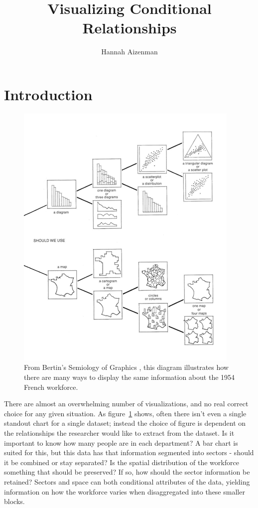 \documentclass[letterpaper,onecolumn,titlepage]{Ythesis}
\title{Visualizing Conditional Relationships}
\author{Hannah Aizenman}
\begin{document}
\makefrontmatter

\section{Introduction}
\label{sec:introduction}
\begin{figure}
  \includegraphics[width=\textwidth]{chart_chooser.png}
  \caption{From Bertin's Semiology of Graphics \cite{bertin_semiology_2011}, this diagram
    illustrates how there are many ways to display the same information about the 1954 French
  workforce.}
  \label{fig:chart_chooser}
\end{figure}

There are almost an overwhelming number of visualizations, and no real correct
choice for any given situation. As figure~\ref{fig:chart_chooser} shows, often
there isn't even a single standout chart for a single dataset; instead the
choice of figure is dependent on the relationships the researcher would like to
extract from the dataset. Is it important to know how many people are in each
department? A bar chart is suited for this, but this data has that information
segmented into sectors - should it be combined or stay separated? Is the
spatial distribution of the workforce something that should be preserved? If
so, how should the sector information be retained? Sectors and space can both
conditional attributes of the data, yielding information on how the workforce
varies when disaggregated into these smaller blocks.
\end{document}
